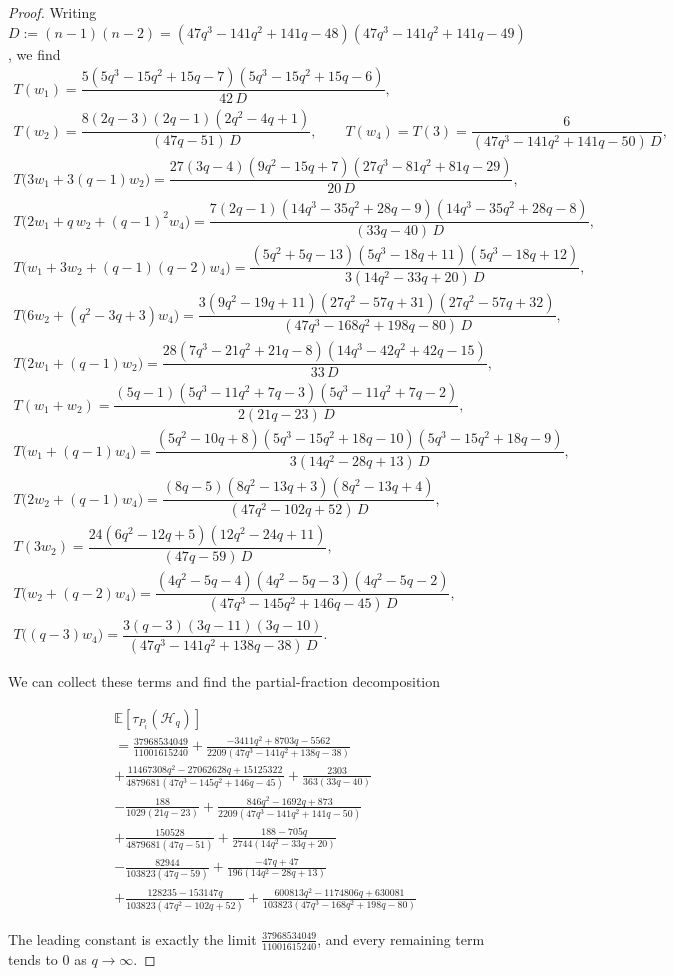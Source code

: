 \documentclass{article}
\newcommand{\E}{\mathbb{E}}
\begin{document}
\begin{proof}
Writing $D:=(n-1)(n-2)=(47q^3-141q^2+141q-48)(47q^3-141q^2+141q-49)$, we find
\[
\begin{array}{l}
T(w_1)=\dfrac{5(5q^3-15q^2+15q-7)(5q^3-15q^2+15q-6)}{42\,D},\\
T(w_2)=\dfrac{8(2q-3)(2q-1)(2q^2-4q+1)}{(47q-51)\,D},\qquad
T(w_4)=T(3)=\dfrac{6}{(47q^3-141q^2+141q-50)\,D},\\
T\!\big(3w_1+3(q-1)w_2\big)=\dfrac{27(3q-4)(9q^2-15q+7)(27q^3-81q^2+81q-29)}{20\,D},\\
T\!\big(2w_1+q\,w_2+(q-1)^2w_4\big)
   =\dfrac{7(2q-1)(14q^3-35q^2+28q-9)(14q^3-35q^2+28q-8)}{(33q-40)\,D},\\
T\!\big(w_1+3w_2+(q-1)(q-2)w_4\big)
   =\dfrac{(5q^2+5q-13)(5q^3-18q+11)(5q^3-18q+12)}{3(14q^2-33q+20)\,D},\\
T\!\big(6w_2+(q^2-3q+3)w_4\big)
   =\dfrac{3(9q^2-19q+11)(27q^2-57q+31)(27q^2-57q+32)}{(47q^3-168q^2+198q-80)\,D},\\
T\!\big(2w_1+(q-1)w_2\big)
   =\dfrac{28(7q^3-21q^2+21q-8)(14q^3-42q^2+42q-15)}{33\,D},\\
T(w_1+w_2)=\dfrac{(5q-1)(5q^3-11q^2+7q-3)(5q^3-11q^2+7q-2)}{2(21q-23)\,D},\\
T\!\big(w_1+(q-1)w_4\big)
   =\dfrac{(5q^2-10q+8)(5q^3-15q^2+18q-10)(5q^3-15q^2+18q-9)}{3(14q^2-28q+13)\,D},\\
T\!\big(2w_2+(q-1)w_4\big)
   =\dfrac{(8q-5)(8q^2-13q+3)(8q^2-13q+4)}{(47q^2-102q+52)\,D},\\
T(3w_2)=\dfrac{24(6q^2-12q+5)(12q^2-24q+11)}{(47q-59)\,D},\\
T\!\big(w_2+(q-2)w_4\big)
   =\dfrac{(4q^2-5q-4)(4q^2-5q-3)(4q^2-5q-2)}{(47q^3-145q^2+146q-45)\,D},\\
T\!\big((q-3)w_4\big)=\dfrac{3(q-3)(3q-11)(3q-10)}{(47q^3-141q^2+138q-38)\,D}.
\end{array}
\]

We can collect these terms and find the partial-fraction decomposition

\begin{align*}
&\E[\tau_{P_i}(\mathcal H_q)]\\
&=\frac{37968534049}{11001615240} + \frac{-3411 q^2 + 8703 q - 5562}{2209 (47 q^3 - 141 q^2 + 138 q - 38)} \\&+ \frac{11467308 q^2 - 27062628 q + 15125322}{4879681 (47 q^3 - 145 q^2 + 146 q - 45)} + \frac{2303}{363 (33 q - 40)} \\&- \frac{188}{1029 (21 q - 23)} + \frac{846 q^2 - 1692 q + 873}{2209 (47 q^3 - 141 q^2 + 141 q - 50)} \\&+ \frac{150528}{4879681 (47 q - 51)} + \frac{188 - 705 q}{2744 (14 q^2 - 33 q + 20)} \\&- \frac{82944}{103823 (47 q - 59)} + \frac{-47 q + 47}{196 (14 q^2 - 28 q + 13)}\\&+ \frac{128235 - 153147 q}{103823 (47 q^2 - 102 q + 52)} + \frac{600813 q^2 - 1174806 q + 630081}{103823 (47 q^3 - 168 q^2 + 198 q - 80)}
\end{align*}

The leading constant is exactly the limit $\tfrac{37968534049}{11001615240}$, and
every remaining term tends to $0$ as $q\to\infty$.
\end{proof}
\end{document}
